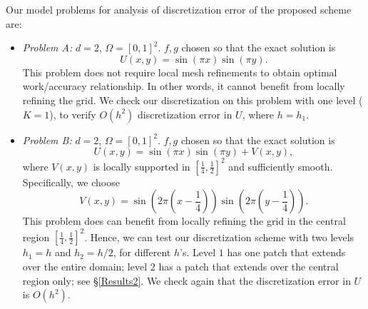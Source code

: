 \documentclass[12pt]{article}
\def \be {\begin{equation}}
\def \ee {\end{equation}}
\def \bi {\begin{itemize}}
\def \ei {\end{itemize}}
\begin{document}
Our model problems for analysis of discretization error of the proposed scheme
are:
\bi
\item \emph{Problem A:} $d = 2$, $\Omega = [0,1]^2$.
$f,g$ chosen so that the exact solution is
\be
U(x,y) = \sin\left(\pi x\right) \sin\left(\pi y\right).
\ee
This problem does not require local mesh refinements to obtain optimal
work/accuracy relationship. In other words, it cannot benefit from locally
refining the grid. We check our discretization on this problem with one level
($K=1$), to verify $O(h^2)$ discretization error in $U$, where $h=h_1$.

\item \emph{Problem B:} $d = 2$, $\Omega = [0,1]^2$.
$f,g$ chosen so that the exact solution is
\be
U(x,y) = \sin(\pi x) \sin(\pi y) + V(x,y),
\ee
where $V(x,y)$ is locally supported in $[\frac14,\frac12]^2$ and sufficiently
smooth. Specifically, we choose
\be
V(x,y) = \sin\left(2 \pi (x-\frac14)\right)
\sin\left(2 \pi (y - \frac14)\right).
\ee
This problem does can benefit from locally refining the grid in the central
region $[\frac14,\frac12]^2$. Hence, we can test our discretization scheme
with two levels $h_1=h$ and $h_2=h/2$, for different $h$'s. Level $1$ has
one patch that extends over the entire domain; level $2$ has a patch that
extends over the central region only; see \S \ref{Results2}. We check again
that the discretization error in $U$ is $O(h^2)$.
\ei

\newpage



\end{document}
